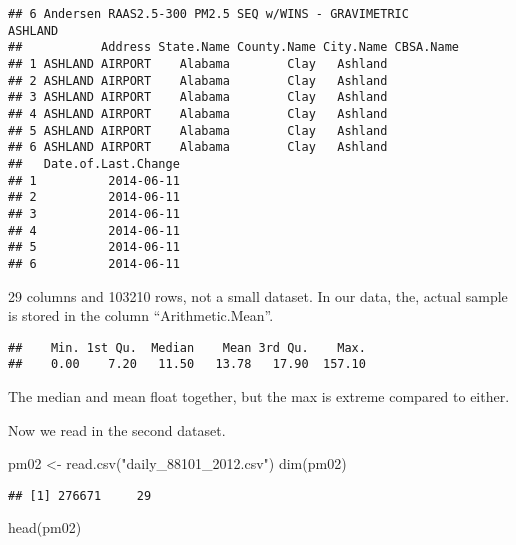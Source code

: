 \documentclass[
]{article}
\newenvironment{Shaded}{\begin{snugshade}}{\end{snugshade}}
\newcommand{\FunctionTok}[1]{\textcolor[rgb]{0.00,0.00,0.00}{#1}}
\newcommand{\NormalTok}[1]{#1}
\newcommand{\OtherTok}[1]{\textcolor[rgb]{0.56,0.35,0.01}{#1}}
\newcommand{\SpecialCharTok}[1]{\textcolor[rgb]{0.00,0.00,0.00}{#1}}
\newcommand{\StringTok}[1]{\textcolor[rgb]{0.31,0.60,0.02}{#1}}
\begin{document}
\begin{verbatim}
## 6 Andersen RAAS2.5-300 PM2.5 SEQ w/WINS - GRAVIMETRIC         ASHLAND
##           Address State.Name County.Name City.Name CBSA.Name
## 1 ASHLAND AIRPORT    Alabama        Clay   Ashland          
## 2 ASHLAND AIRPORT    Alabama        Clay   Ashland          
## 3 ASHLAND AIRPORT    Alabama        Clay   Ashland          
## 4 ASHLAND AIRPORT    Alabama        Clay   Ashland          
## 5 ASHLAND AIRPORT    Alabama        Clay   Ashland          
## 6 ASHLAND AIRPORT    Alabama        Clay   Ashland          
##   Date.of.Last.Change
## 1          2014-06-11
## 2          2014-06-11
## 3          2014-06-11
## 4          2014-06-11
## 5          2014-06-11
## 6          2014-06-11
\end{verbatim}

29 columns and 103210 rows, not a small dataset. In our data, the,
actual sample is stored in the column ``Arithmetic.Mean''.

\begin{Shaded}
\end{Shaded}

\begin{verbatim}
##    Min. 1st Qu.  Median    Mean 3rd Qu.    Max. 
##    0.00    7.20   11.50   13.78   17.90  157.10
\end{verbatim}

The median and mean float together, but the max is extreme compared to
either.

Now we read in the second dataset.

\begin{Shaded}
\begin{Highlighting}[]
\NormalTok{pm02 }\OtherTok{\textless{}{-}} \FunctionTok{read.csv}\NormalTok{(}\StringTok{"daily\_88101\_2012.csv"}\NormalTok{)}
\FunctionTok{dim}\NormalTok{(pm02)}
\end{Highlighting}
\end{Shaded}

\begin{verbatim}
## [1] 276671     29
\end{verbatim}

\begin{Shaded}
\begin{Highlighting}[]
\FunctionTok{head}\NormalTok{(pm02)}
\end{Highlighting}
\end{Shaded}
\end{document}
